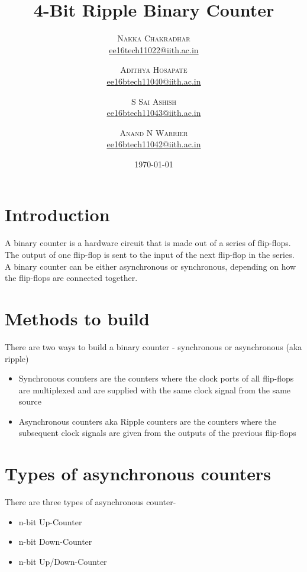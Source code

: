 \documentclass[twoside,twocolumn]{article}
\title{4-Bit Ripple Binary Counter} %
\author{%
\textsc{Nakka Chakradhar}\\[1ex] %
\normalsize \href{mailto:ee16tech11022@iith.ac.in}{ee16tech11022@iith.ac.in} %
\and %
\textsc{Adithya Hosapate}\\[1ex] %
\normalsize \href{mailto:ee16btech11040@iith.ac.in}{ee16btech11040@iith.ac.in} %
\and %
\textsc{S Sai Ashish}\\[1ex] %
\normalsize \href{mailto:ee16btech11043@iith.ac.in}{ee16btech11043@iith.ac.in} %
\and %
\textsc{Anand N Warrier}\\[1ex] %
\normalsize \href{mailto:ee16btech11042@iith.ac.in}{ee16btech11042@iith.ac.in} %
}
\date{\today} %
\begin{document}
\maketitle


\section{Introduction}

A binary counter is a hardware circuit that is made out of a series of flip-flops. The output of one flip-flop is sent to the input of the next flip-flop in the series. A binary counter can be either asynchronous or synchronous, depending on how the flip-flops are connected together.

\section{Methods to build}

There are two ways to build a binary counter - synchronous or asynchronous (aka ripple)
\begin{itemize}
\item Synchronous counters are the counters where the clock ports of all flip-flops are multiplexed and are supplied with the same clock signal from the same source
\item Asynchronous counters aka Ripple counters are the counters where the subsequent clock signals are given from the outputs of the previous flip-flops
\end{itemize}

\section{Types of asynchronous counters}

There are three types of asynchronous counter-
\begin{itemize}
	\item n-bit Up-Counter
	\item n-bit Down-Counter
	\item n-bit Up/Down-Counter 
\end{itemize}
\end{document}
